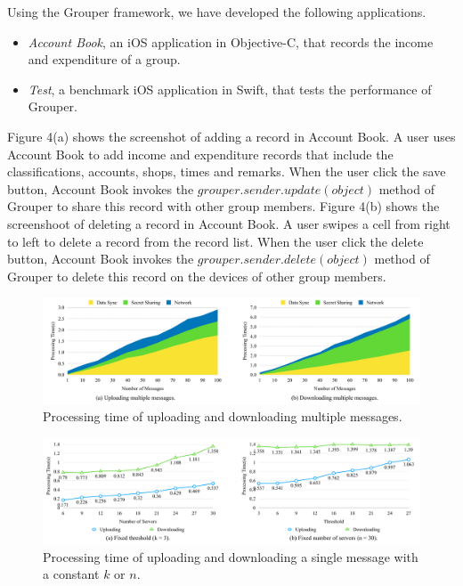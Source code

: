\documentclass[sigconf]{acmart}
\begin{document}
Using the Grouper framework, we have developed the following applications. 

\begin{itemize}
	\setlength{\itemsep}{1pt}
	\setlength{\parskip}{0pt}
	\setlength{\parsep}{0pt}
	\item \emph{Account Book}, an iOS application in Objective-C, that records the income and expenditure of a group.
	\item \emph{Test}, a benchmark iOS application in Swift, that tests the performance of Grouper.
\end{itemize}

Figure 4(a) shows the screenshot of adding a record in Account Book. 
A user uses Account Book to add income and expenditure records that include the classifications, accounts, shops, times and remarks. 
When the user click the save button, Account Book invokes the $grouper.sender.update(object)$ method of Grouper to share this record with other group members.
Figure 4(b) shows the screenshoot of deleting a record in Account Book. 
A user swipes a cell from right to left to delete a record from the record list. 
When the user click the delete button, Account Book invokes the $grouper.sender.delete(object)$ method of Grouper to delete this record on the devices of other group members.

\begin{figure}[t]
	\centering
	\includegraphics[scale=0.13]{multiple_messages}
	\caption{Processing time of uploading and downloading multiple messages.}
\end{figure}

\begin{figure}[t]
	\centering
	\includegraphics[scale=0.13]{constant_k_n}
	\caption{Processing time of uploading and downloading a single message with a constant ${k}$ or ${n}$.}
\end{figure}
\end{document}
